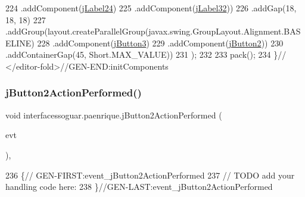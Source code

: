\begin{DoxyCode}
224                     .addComponent(\mbox{\hyperlink{classinterfacessoguar_1_1paenrique_a2ac7ac55fe97038c90f1e66dd1af19d0}{jLabel24}})
225                     .addComponent(\mbox{\hyperlink{classinterfacessoguar_1_1paenrique_a3b351505fc92b75748aed4174668f4c0}{jLabel32}}))
226                 .addGap(18, 18, 18)
227                 .addGroup(layout.createParallelGroup(javax.swing.GroupLayout.Alignment.BASELINE)
228                     .addComponent(\mbox{\hyperlink{classinterfacessoguar_1_1paenrique_ac5655995cee95415c5fa0bfd6eb58b49}{jButton3}})
229                     .addComponent(\mbox{\hyperlink{classinterfacessoguar_1_1paenrique_a893537fc97884d87f31ed05c28ffa158}{jButton2}}))
230                 .addContainerGap(45, Short.MAX\_VALUE))
231         );
232 
233         pack();
234     \}\textcolor{comment}{// </editor-fold>//GEN-END:initComponents}
\end{DoxyCode}
\mbox{\label{classinterfacessoguar_1_1paenrique_a34ea7075cb88cd57a469832b7fa53e7f}} 
\subsubsection{\texorpdfstring{j\+Button2\+Action\+Performed()}{jButton2ActionPerformed()}}
{\footnotesize\ttfamily void interfacessoguar.\+paenrique.\+j\+Button2\+Action\+Performed (\begin{DoxyParamCaption}\item[{java.\+awt.\+event.\+Action\+Event}]{evt }\end{DoxyParamCaption})\hspace{0.3cm}{\ttfamily [inline]}, {\ttfamily [private]}}


\begin{DoxyCode}
236                                                                          \{\textcolor{comment}{//
      GEN-FIRST:event\_jButton2ActionPerformed}
237         \textcolor{comment}{// TODO add your handling code here:}
238     \}\textcolor{comment}{//GEN-LAST:event\_jButton2ActionPerformed}
\end{DoxyCode}
\mbox{\label{classinterfacessoguar_1_1paenrique_adbe22819e6df43b7a194f04c14a31a4d}} 
